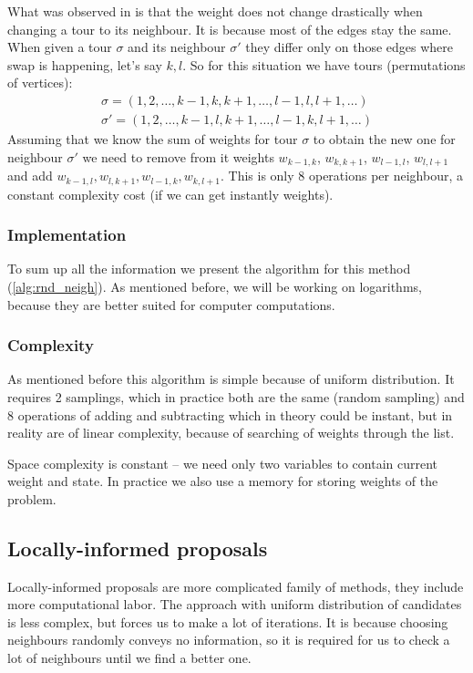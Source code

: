 		What was observed in \cite{decryption_tsp_MCMC} is that the weight does not change drastically when changing a tour to its neighbour. It is because most of the edges stay the same. When given a tour $\sigma$ and its neighbour $\sigma'$ they differ only on those edges where swap is happening, let's say $k,l$. So for this situation we have tours (permutations of vertices):
		\begin{align*}
			\sigma = (1, 2, \ldots, k-1, k, k+1, \ldots, l-1, l, l+1, \ldots) \\
			\sigma' = (1, 2, \ldots, k-1, l, k+1, \ldots, l-1, k, l+1, \ldots)
		\end{align*}
		Assuming that we know the sum of weights for tour $\sigma$ to obtain the new one for neighbour $\sigma'$ we need to remove from it weights $w_{k-1, k}$, $w_{k, k+1}$, $w_{l-1, l}$, $w_{l, l+1}$ and add $w_{k-1, l}, w_{l, k+1}, w_{l-1, k}, w_{k, l+1}$. This is only $8$ operations per neighbour, a constant complexity cost (if we can get instantly weights).
		
	\subsubsection{Implementation}
		To sum up all the information we present the algorithm for this method (\ref{alg:rnd_neigh}). As mentioned before, we will be working on logarithms, because they are better suited for computer computations.
		
		
		
	\subsubsection{Complexity}
		As mentioned before this algorithm is simple because of uniform distribution. It requires 2 samplings, which in practice both are the same (random sampling) and 8 operations of adding and subtracting which in theory could be instant, but in reality are of linear complexity, because of searching of weights through the list.
		
		Space complexity is constant -- we need only two variables to contain current weight and state. In practice we also use a memory for storing weights of the problem.

\subsection{Locally-informed proposals}
	Locally-informed proposals are more complicated family of methods, they include more computational labor. The approach with uniform distribution of candidates is less complex, but forces us to make a lot of iterations. It is because choosing neighbours randomly conveys no information, so it is required for us to check a lot of neighbours until we find a better one. 
	
